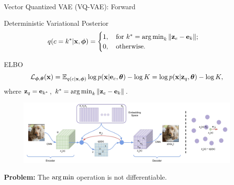 \documentclass{beamer}
\begin{document}
\begin{frame}{Vector Quantized VAE (VQ-VAE): Forward}
	\begin{block}{Deterministic Variational Posterior}
		\vspace{-0.3cm}
		\[
			q(c = k^* | \mathbf{x}, \boldsymbol{\phi}) = \begin{cases}
			1 , \quad \text{for } k^* = \operatorname*{arg\,min}_k \| \mathbf{z}_e - \mathbf{e}_k \|; \\
			0, \quad \text{otherwise}.
			\end{cases}
		\]
	\vspace{-0.5cm}
	\end{block}	
	\begin{block}{ELBO}
		\vspace{-0.6cm}
		\[
		\mathcal{L}_{\boldsymbol{\phi}, \boldsymbol{\theta}}(\mathbf{x})  = \mathbb{E}_{q(c | \mathbf{x}, \boldsymbol{\phi})} \log p(\mathbf{x} | \mathbf{e}_{c} , \boldsymbol{\theta}) - \log K =  \log p(\mathbf{x} | \mathbf{z}_q, \boldsymbol{\theta}) - \log K,
		\]
		where $\mathbf{z}_q = \mathbf{e}_{k^*}$, $k^* = \operatorname*{arg\,min}_k \| \mathbf{z}_e - \mathbf{e}_k \|$.
	\end{block}
	\vspace{-0.3cm} 
	\begin{figure}
		\centering
		\includegraphics[width=0.85\linewidth]{figs/vqvae}
	\end{figure}
	\vspace{-0.3cm} 
	\textbf{Problem:} The $\operatorname*{arg\,min}$ operation is not differentiable.
\end{frame}
\end{document}
